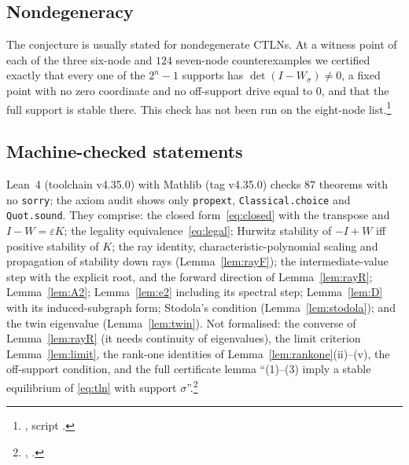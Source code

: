 \documentclass[11pt]{article}
\theoremstyle{definition}
\newcommand{\eps}{\varepsilon}
\begin{document}
{\subsection{Nondegeneracy}
The conjecture is usually stated for nondegenerate CTLNs. At a witness point of each of the three six-node and $124$ seven-node
counterexamples we certified exactly that every one of the $2^n-1$ supports has $\det(I-W_\sigma)\ne0$, a fixed point with no zero
coordinate and no off-support drive equal to $0$, and that the full support is stable there. This check has not been
run on the eight-node list.\footnote{, script .}

\subsection{Machine-checked statements}
Lean~4 (toolchain v4.35.0) with Mathlib (tag v4.35.0) checks $87$ theorems with no \texttt{sorry}; the axiom audit shows only
\texttt{propext}, \texttt{Classical.choice} and \texttt{Quot.sound}. They comprise: the closed form~\eqref{eq:closed} with the
transpose and $I-W=\eps K$; the legality equivalence~\eqref{eq:legal}; Hurwitz stability of $-I+W$ iff positive stability of $K$;
the ray identity, characteristic-polynomial scaling and propagation of stability down rays (Lemma~\ref{lem:rayF}); the
intermediate-value step with the explicit root, and the forward direction of Lemma~\ref{lem:rayR}; Lemma~\ref{lem:A2};
Lemma~\ref{lem:e2} including its spectral step; Lemma~\ref{lem:D} with its induced-subgraph form; Stodola's condition
(Lemma~\ref{lem:stodola}); and the twin eigenvalue (Lemma~\ref{lem:twin}). Not formalised: the converse of Lemma~\ref{lem:rayR}
(it needs continuity of eigenvalues), the limit criterion Lemma~\ref{lem:limit}, the rank-one identities of
Lemma~\ref{lem:rankone}(ii)--(v), the off-support condition, and the full certificate lemma ``(1)--(3) imply a stable equilibrium of
\eqref{eq:tln} with support $\sigma$''.\footnote{, .}

}
\end{document}
